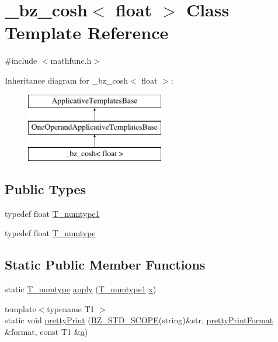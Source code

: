 \hypertarget{class__bz__cosh_3_01float_01_4}{}\section{\+\_\+bz\+\_\+cosh$<$ float $>$ Class Template Reference}
\label{class__bz__cosh_3_01float_01_4}


{\ttfamily \#include $<$mathfunc.\+h$>$}

Inheritance diagram for \+\_\+bz\+\_\+cosh$<$ float $>$\+:\begin{figure}[H]
\begin{center}
\leavevmode
\includegraphics[height=3.000000cm]{class__bz__cosh_3_01float_01_4}
\end{center}
\end{figure}
\subsection*{Public Types}
\begin{DoxyCompactItemize}
\item 
typedef float \hyperlink{class__bz__cosh_3_01float_01_4_a6748b86f0e7ba3c588c3b93fdebe98db}{T\+\_\+numtype1}
\item 
typedef float \hyperlink{class__bz__cosh_3_01float_01_4_a97cd495915e94af4ba8431af5c1d68a2}{T\+\_\+numtype}
\end{DoxyCompactItemize}
\subsection*{Static Public Member Functions}
\begin{DoxyCompactItemize}
\item 
static \hyperlink{class__bz__cosh_3_01float_01_4_a97cd495915e94af4ba8431af5c1d68a2}{T\+\_\+numtype} \hyperlink{class__bz__cosh_3_01float_01_4_af3ecfd2dd298b88b87107148da0786db}{apply} (\hyperlink{class__bz__cosh_3_01float_01_4_a6748b86f0e7ba3c588c3b93fdebe98db}{T\+\_\+numtype1} \hyperlink{vecnorm1_8cc_ac73eed9e41ec09d58f112f06c2d6cb63}{x})
\item 
{\footnotesize template$<$typename T1 $>$ }\\static void \hyperlink{class__bz__cosh_3_01float_01_4_a1f80c4506f422ba9fd1f231ade3ac4c6}{pretty\+Print} (\hyperlink{numinquire_8h_a2b24ffc3b4ef9803956bc7715c6c7b83}{B\+Z\+\_\+\+S\+T\+D\+\_\+\+S\+C\+O\+P\+E}(string)\&str, \hyperlink{classprettyPrintFormat}{pretty\+Print\+Format} \&format, const T1 \&\hyperlink{gen__mat5files_8m_aae328bf20413f220e38aec4d95bfd6da}{a})
\end{DoxyCompactItemize}


